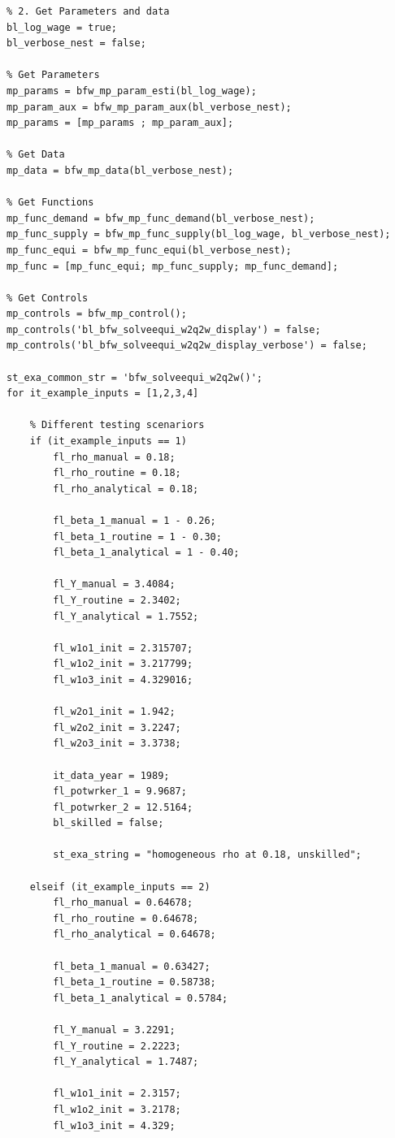 \documentclass[
]{book}
\begin{document}
\begin{verbatim}
% 2. Get Parameters and data
bl_log_wage = true;
bl_verbose_nest = false;

% Get Parameters
mp_params = bfw_mp_param_esti(bl_log_wage);
mp_param_aux = bfw_mp_param_aux(bl_verbose_nest);
mp_params = [mp_params ; mp_param_aux];

% Get Data
mp_data = bfw_mp_data(bl_verbose_nest);

% Get Functions
mp_func_demand = bfw_mp_func_demand(bl_verbose_nest);
mp_func_supply = bfw_mp_func_supply(bl_log_wage, bl_verbose_nest);
mp_func_equi = bfw_mp_func_equi(bl_verbose_nest);
mp_func = [mp_func_equi; mp_func_supply; mp_func_demand];

% Get Controls
mp_controls = bfw_mp_control();
mp_controls('bl_bfw_solveequi_w2q2w_display') = false;
mp_controls('bl_bfw_solveequi_w2q2w_display_verbose') = false;

st_exa_common_str = 'bfw_solveequi_w2q2w()';
for it_example_inputs = [1,2,3,4]

    % Different testing scenariors
    if (it_example_inputs == 1)
        fl_rho_manual = 0.18;
        fl_rho_routine = 0.18;
        fl_rho_analytical = 0.18;

        fl_beta_1_manual = 1 - 0.26;
        fl_beta_1_routine = 1 - 0.30;
        fl_beta_1_analytical = 1 - 0.40;

        fl_Y_manual = 3.4084;
        fl_Y_routine = 2.3402;
        fl_Y_analytical = 1.7552;

        fl_w1o1_init = 2.315707;
        fl_w1o2_init = 3.217799;
        fl_w1o3_init = 4.329016;

        fl_w2o1_init = 1.942;
        fl_w2o2_init = 3.2247;
        fl_w2o3_init = 3.3738;

        it_data_year = 1989;
        fl_potwrker_1 = 9.9687;
        fl_potwrker_2 = 12.5164;
        bl_skilled = false;
        
        st_exa_string = "homogeneous rho at 0.18, unskilled";

    elseif (it_example_inputs == 2)
        fl_rho_manual = 0.64678;
        fl_rho_routine = 0.64678;
        fl_rho_analytical = 0.64678;

        fl_beta_1_manual = 0.63427;
        fl_beta_1_routine = 0.58738;
        fl_beta_1_analytical = 0.5784;

        fl_Y_manual = 3.2291;
        fl_Y_routine = 2.2223;
        fl_Y_analytical = 1.7487;

        fl_w1o1_init = 2.3157;
        fl_w1o2_init = 3.2178;
        fl_w1o3_init = 4.329;


\end{verbatim}
\end{document}
